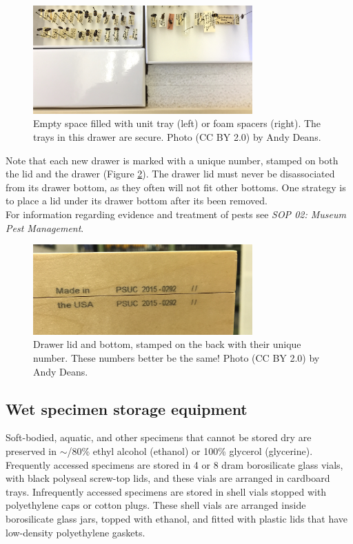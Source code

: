 \documentclass[letterpaper, 11pt]{article}
\begin{document}
\begin{figure}[ht!]
	\centering
  \includegraphics[width=0.75\textwidth]{packedUnitTrays}
  \caption{Empty space filled with unit tray (left) or foam spacers (right). The trays in this drawer are secure. Photo (CC BY 2.0) by Andy Deans.}
  \label{trayspacked}
\end{figure}

\noindent{}Note that each new drawer is marked with a unique number, stamped on both the lid and the drawer (Figure \ref{drawerstamp}). The drawer lid must never be disassociated from its drawer bottom, as they often will not fit other bottoms. One strategy is to place a lid under its drawer bottom after its been removed.\\

\noindent{}For information regarding evidence and treatment of pests see \textit{SOP 02: Museum Pest Management}.\\

\begin{figure}[ht!]
	\centering
  \includegraphics[width=0.75\textwidth]{drawerStamp}
  \caption{Drawer lid and bottom, stamped on the back with their unique number. These numbers better be the same! Photo (CC BY 2.0) by Andy Deans.}
  \label{drawerstamp}
\end{figure}

\subsection{Wet specimen storage equipment}%
Soft-bodied, aquatic, and other specimens that cannot be stored dry are preserved in $\sim$/80\% ethyl alcohol (ethanol) or 100\% glycerol (glycerine). Frequently accessed specimens are stored in 4 or 8 dram borosilicate glass vials, with black polyseal screw-top lids, and these vials are arranged in cardboard trays. Infrequently accessed specimens are stored in shell vials stopped with polyethylene caps or cotton plugs. These shell vials are arranged inside borosilicate glass jars, topped with ethanol, and fitted with plastic lids that have low-density polyethylene gaskets.
\end{document}
